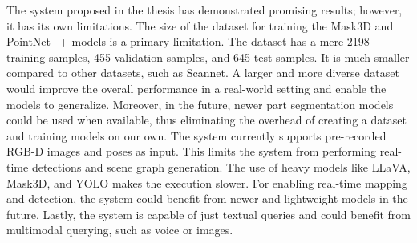 The system proposed in the thesis has demonstrated promising results; however, it has its own limitations. 
The size of the dataset for training the Mask3D and PointNet++ models is a primary limitation. 
The dataset has a mere 2198 training samples, 455 validation samples, and 645 test samples. 
It is much smaller compared to other datasets, such as Scannet. A larger and more diverse dataset would improve the overall performance in a
 real-world setting and enable the models to generalize. Moreover, in the future, newer part segmentation models could be used when available,
  thus eliminating the overhead of creating a dataset and training models on our own. The system currently supports pre-recorded RGB-D 
  images and poses as input. This limits the system from performing real-time detections and scene graph generation. 
  The use of heavy models like LLaVA, Mask3D, and YOLO makes the execution slower. For enabling real-time mapping and detection,
   the system could benefit from newer and lightweight models in the future. Lastly, the system is capable of just textual queries
    and could benefit from multimodal querying, such as voice or images.

